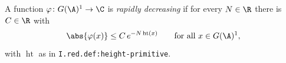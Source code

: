 A function $\varphi\colon G(\A)^1\to\C$ is \emph{rapidly decreasing} if for every $N\in\R$ there is $C\in\R$ with
\[
  \abs{\varphi(x)}\le C\,e^{-N\operatorname{ht}(x)}\qquad\text{for all }x\in G(\A)^1,
\]
with $\operatorname{ht}$ as in \texttt{I.red.def:height-primitive}.
